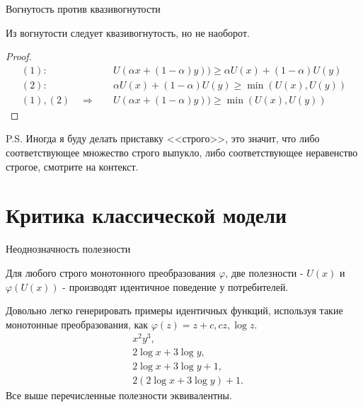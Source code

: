 \documentclass{beamer}
\begin{document}
\begin{frame}{Вогнутость против квазивогнутости}

\begin{lemma}
Из вогнутости следует квазивогнутость, но не наоборот.
\end{lemma}

\begin{proof}
\begin{align*} 
(1) : & \quad U(\alpha x + (1-\alpha) y)) \geqslant \alpha U(x) + (1-\alpha) U(y) \\
(2) : & \quad \alpha U(x) + (1-\alpha) U(y) \geqslant \min (U(x), U(y))\\
(1), (2) \quad \Rightarrow & \quad U(\alpha x + (1-\alpha) y)) \geqslant \min (U(x), U(y))
\end{align*}
\end{proof}

P.S. Иногда я буду делать приставку <<\alert{строго}>>, это значит, что либо соответствующее множество строго выпукло, либо соответствующее неравенство строгое, смотрите на контекст.

\end{frame}

\section{Критика классической модели}

\begin{frame}{Неоднозначность полезности}

Для любого строго монотонного преобразования $\varphi$, две полезности - $U(x)$ и $\varphi(U(x))$ - производят идентичное поведение у потребителей.  

Довольно легко генерировать примеры идентичных функций, используя такие монотонные преобразования, как $\varphi(z) = z + c, cz , \log z$.
\begin{align*}
& x^2y^3,\\
& 2\log x + 3\log y,\\
& 2\log x + 3\log y + 1,\\
& 2(2\log x + 3\log y) + 1.
\end{align*}
Все выше перечисленные полезности эквивалентны.
\end{frame}
\end{document}

